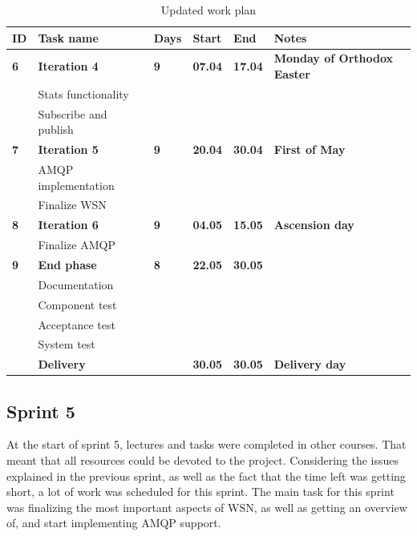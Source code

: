 \begin{center}
\begin{table}[ht!]
\centering
\small
\begin{tabular}{ | m{0.4cm} | m{3.3cm}| m{0.7cm} | m{0.9cm} | m{0.9cm}| m{4.4cm} |} 
\hline
\rowcolor{lightgray}
\textbf{ID} & \textbf{Task name} & \textbf{Days} & \textbf{Start} & \textbf{End} & \textbf{Notes} \\
\hline
\textbf{6} & \textbf{Iteration 4} & \textbf{9} & \textbf{07.04} & \textbf{17.04} & \textbf{Monday of Orthodox Easter} \\
 & Stats functionality & & & & \\
 & Subscribe and publish  & & & & \\
\hline
\textbf{7} & \textbf{Iteration 5} & \textbf{9} & \textbf{20.04} & \textbf{30.04} & \textbf{First of May} \\
 & AMQP implementation & & & & \\
 & Finalize WSN & & & & \\
\hline 
\textbf{8} & \textbf{Iteration 6} & \textbf{9} & \textbf{04.05} & \textbf{15.05} & \textbf{Ascension day} \\
 & Finalize AMQP & & & & \\
\hline
\textbf{9} & \textbf{End phase} & \textbf{8} & \textbf{22.05} & \textbf{30.05} & \\
 & Documentation & & & & \\
 & Component test & & & & \\
 & Acceptance test & & & & \\
 & System test & & & & \\
 & \textbf{Delivery} & & \textbf{30.05} & \textbf{30.05} & \textbf{Delivery day} \\
\hline
\end{tabular}
\caption{Updated work plan}
\label{tab:workplan, revised}
\end{table}
\end{center}

\subsection{Sprint 5}
\label{subsec:project_lifecycle-development-sprint_5}
At the start of sprint 5, lectures and tasks were completed in other courses. That meant that all resources could be devoted to the project. Considering the issues explained in the previous sprint, as well as the fact that the time left was getting short, a lot of work was scheduled for this sprint. The main task for this sprint was finalizing the most important aspects of WSN, as well as getting an overview of, and start implementing AMQP support.

